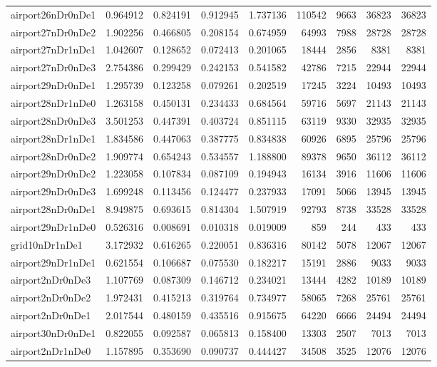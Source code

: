 \documentclass[../../../thesis.tex]{subfiles}
\begin{document}
\begin{longtable}{|l|r|r|r|r|r|r|r|r|}
airport26nDr0nDe1 & 0.964912 & 0.824191 & 0.912945 & 1.737136 & 110542 & 9663 & 36823 & 36823 \\
airport27nDr0nDe2 & 1.902256 & 0.466805 & 0.208154 & 0.674959 & 64993 & 7988 & 28728 & 28728 \\
airport27nDr1nDe1 & 1.042607 & 0.128652 & 0.072413 & 0.201065 & 18444 & 2856 & 8381 & 8381 \\
airport27nDr0nDe3 & 2.754386 & 0.299429 & 0.242153 & 0.541582 & 42786 & 7215 & 22944 & 22944 \\
airport29nDr0nDe1 & 1.295739 & 0.123258 & 0.079261 & 0.202519 & 17245 & 3224 & 10493 & 10493 \\
airport28nDr1nDe0 & 1.263158 & 0.450131 & 0.234433 & 0.684564 & 59716 & 5697 & 21143 & 21143 \\
airport28nDr0nDe3 & 3.501253 & 0.447391 & 0.403724 & 0.851115 & 63119 & 9330 & 32935 & 32935 \\
airport28nDr1nDe1 & 1.834586 & 0.447063 & 0.387775 & 0.834838 & 60926 & 6895 & 25796 & 25796 \\
airport28nDr0nDe2 & 1.909774 & 0.654243 & 0.534557 & 1.188800 & 89378 & 9650 & 36112 & 36112 \\
airport29nDr0nDe2 & 1.223058 & 0.107834 & 0.087109 & 0.194943 & 16134 & 3916 & 11606 & 11606 \\
airport29nDr0nDe3 & 1.699248 & 0.113456 & 0.124477 & 0.237933 & 17091 & 5066 & 13945 & 13945 \\
airport28nDr0nDe1 & 8.949875 & 0.693615 & 0.814304 & 1.507919 & 92793 & 8738 & 33528 & 33528 \\
airport29nDr1nDe0 & 0.526316 & 0.008691 & 0.010318 & 0.019009 & 859 & 244 & 433 & 433 \\
grid10nDr1nDe1 & 3.172932 & 0.616265 & 0.220051 & 0.836316 & 80142 & 5078 & 12067 & 12067 \\
airport29nDr1nDe1 & 0.621554 & 0.106687 & 0.075530 & 0.182217 & 15191 & 2886 & 9033 & 9033 \\
airport2nDr0nDe3 & 1.107769 & 0.087309 & 0.146712 & 0.234021 & 13444 & 4282 & 10189 & 10189 \\
airport2nDr0nDe2 & 1.972431 & 0.415213 & 0.319764 & 0.734977 & 58065 & 7268 & 25761 & 25761 \\
airport2nDr0nDe1 & 2.017544 & 0.480159 & 0.435516 & 0.915675 & 64220 & 6666 & 24494 & 24494 \\
airport30nDr0nDe1 & 0.822055 & 0.092587 & 0.065813 & 0.158400 & 13303 & 2507 & 7013 & 7013 \\
airport2nDr1nDe0 & 1.157895 & 0.353690 & 0.090737 & 0.444427 & 34508 & 3525 & 12076 & 12076 \\

\end{longtable}
\end{document}
